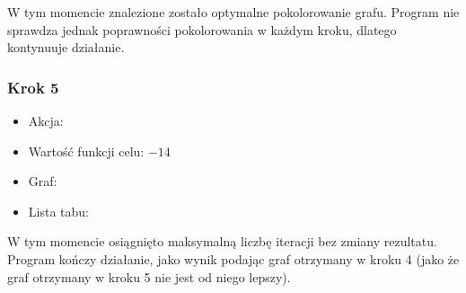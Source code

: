 W tym momencie znalezione zostało optymalne pokolorowanie grafu.
Program nie sprawdza jednak poprawności pokolorowania w każdym kroku, dlatego kontynuuje działanie.


\subsubsection{Krok 5}

\begin{itemize}
  \item Akcja:

  \item Wartość funkcji celu: $-14$

  \item Graf:


  \item Lista tabu:
\end{itemize}

W tym momencie osiągnięto maksymalną liczbę iteracji bez zmiany rezultatu.
Program kończy działanie, jako wynik podając graf otrzymany w kroku 4 (jako że graf otrzymany w kroku 5 nie jest od niego lepszy).